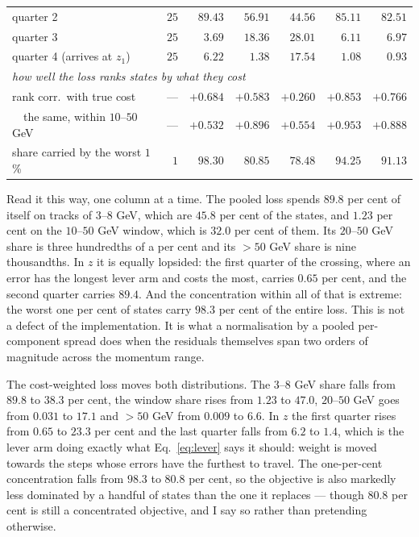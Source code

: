\documentclass[11pt,a4paper]{article}
\begin{document}
\begin{table}[tbp]
\begin{tabular}{lrrrrrr}
    quarter 2                         & $25$ & $89.43$ & $56.91$ & $44.56$ & $85.11$ & $82.51$ \\
    quarter 3                         & $25$ & $3.69$  & $18.36$ & $28.01$ & $6.11$  & $6.97$ \\
    quarter 4 (arrives at $z_1$)      & $25$ & $6.22$  & $1.38$  & $17.54$ & $1.08$  & $0.93$ \\
    \midrule
    \multicolumn{7}{l}{\emph{how well the loss ranks states by what they cost}}\\
    rank corr.\ with true cost        & --- & $+0.684$ & $+0.583$ & $+0.260$ & $+0.853$ & $+0.766$ \\
    \ \ the same, within $10$--$50$ GeV & --- & $+0.532$ & $+0.896$ & $+0.554$ & $+0.953$ & $+0.888$ \\
    share carried by the worst $1$ \% & $1$ & $98.30$ & $80.85$ & $78.48$ & $94.25$ & $91.13$ \\
    \bottomrule
  \end{tabular}
\end{table}

Read it this way, one column at a time. The pooled loss spends $89.8$ per cent
of itself on tracks of $3$--$8$ GeV, which are $45.8$ per cent of the states,
and $1.23$ per cent on the $10$--$50$ GeV window, which is $32.0$ per cent of
them. Its $20$--$50$ GeV share is three hundredths of a per cent and its
$>50$ GeV share is nine thousandths. In $z$ it is equally lopsided: the first
quarter of the crossing, where an error has the longest lever arm and costs the
most, carries $0.65$ per cent, and the second quarter carries $89.4$. And the
concentration within all of that is extreme: the worst one per cent of states
carry $98.3$ per cent of the entire loss. This is not a defect of the
implementation. It is what a normalisation by a pooled per-component spread
does when the residuals themselves span two orders of magnitude across the
momentum range.

The cost-weighted loss moves both distributions. The $3$--$8$ GeV share falls
from $89.8$ to $38.3$ per cent, the window share rises from $1.23$ to $47.0$,
$20$--$50$ GeV goes from $0.031$ to $17.1$ and $>50$ GeV from $0.009$ to $6.6$.
In $z$ the first quarter rises from $0.65$ to $23.3$ per cent and the last
quarter falls from $6.2$ to $1.4$, which is the lever arm doing exactly what
Eq.~\eqref{eq:lever} says it should: weight is moved towards the steps whose
errors have the furthest to travel. The one-per-cent concentration falls from
$98.3$ to $80.8$ per cent, so the objective is also markedly less dominated by
a handful of states than the one it replaces --- though $80.8$ per cent is still
a concentrated objective, and I say so rather than pretending otherwise.
\end{document}

